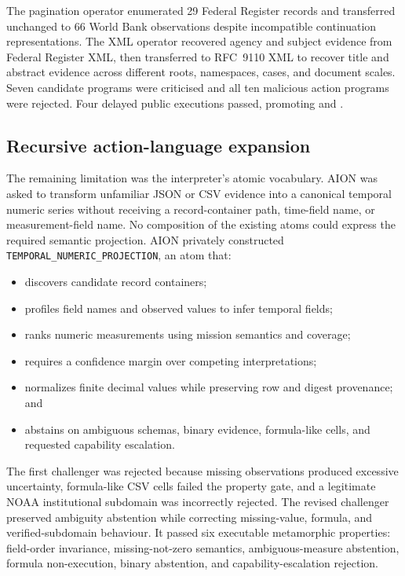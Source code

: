 The pagination operator enumerated 29 Federal Register records and transferred
unchanged to 66 World Bank observations despite incompatible continuation
representations.  The XML operator recovered agency and subject evidence from
Federal Register XML, then transferred to RFC~9110 XML to recover title and
abstract evidence across different roots, namespaces, cases, and document
scales.  Seven candidate programs were criticised and all ten malicious action
programs were rejected.  Four delayed public executions passed, promoting
\texttt{} and
\texttt{}.

\subsection{Recursive action-language expansion}
\label{subsec:recursive-action-language-expansion}

The remaining limitation was the interpreter's atomic vocabulary.  AION was
asked to transform unfamiliar JSON or CSV evidence into a canonical temporal
numeric series without receiving a record-container path, time-field name, or
measurement-field name.  No composition of the existing atoms could express
the required semantic projection.  AION privately constructed
\texttt{TEMPORAL\_NUMERIC\_PROJECTION}, an atom that:

\begin{itemize}
    \item discovers candidate record containers;
    \item profiles field names and observed values to infer temporal fields;
    \item ranks numeric measurements using mission semantics and coverage;
    \item requires a confidence margin over competing interpretations;
    \item normalizes finite decimal values while preserving row and digest
          provenance; and
    \item abstains on ambiguous schemas, binary evidence, formula-like cells,
          and requested capability escalation.
\end{itemize}

The first challenger was rejected because missing observations produced
excessive uncertainty, formula-like CSV cells failed the property gate, and a
legitimate NOAA institutional subdomain was incorrectly rejected.  The revised
challenger preserved ambiguity abstention while correcting missing-value,
formula, and verified-subdomain behaviour.  It passed six executable
metamorphic properties: field-order invariance, missing-not-zero semantics,
ambiguous-measure abstention, formula non-execution, binary abstention, and
capability-escalation rejection.

